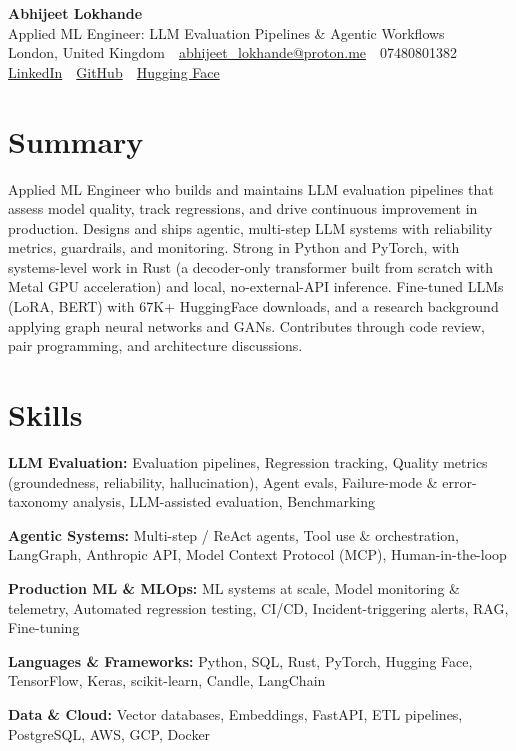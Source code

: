 \documentclass[10pt,a4paper]{article}
\newcommand{\sep}{\,\textcolor{accent!60}{\textbar}\,}
\begin{document}
\begin{center}
  {\fontsize{24}{26}\selectfont\bfseries Abhijeet Lokhande}\\[3pt]
  {\color{accent}\large Applied ML Engineer: LLM Evaluation Pipelines \& Agentic Workflows}\\[5pt]
  {\small
    London, United Kingdom \sep
    \href{mailto:abhijeet_lokhande@proton.me}{abhijeet\_lokhande@proton.me} \sep
    07480801382 \\[2pt]
    \href{https://www.linkedin.com/in/ablds/}{LinkedIn} \sep
    \href{https://github.com/abhijeetscode}{GitHub} \sep
    \href{https://huggingface.co/ab-ai}{Hugging Face}
  }
\end{center}
\vspace{2pt}

\section{Summary}
Applied ML Engineer who builds and maintains LLM evaluation pipelines that assess model quality, track regressions, and drive continuous improvement in production. Designs and ships agentic, multi-step LLM systems with reliability metrics, guardrails, and monitoring. Strong in Python and PyTorch, with systems-level work in Rust (a decoder-only transformer built from scratch with Metal GPU acceleration) and local, no-external-API inference. Fine-tuned LLMs (LoRA, BERT) with 67K+ HuggingFace downloads, and a research background applying graph neural networks and GANs. Contributes through code review, pair programming, and architecture discussions.

\section{Skills}
\begin{tight}
  \item[\textcolor{accent}{\small$\bullet$}] \textbf{LLM Evaluation:} Evaluation pipelines, Regression tracking, Quality metrics (groundedness, reliability, hallucination), Agent evals, Failure-mode \& error-taxonomy analysis, LLM-assisted evaluation, Benchmarking
  \item[\textcolor{accent}{\small$\bullet$}] \textbf{Agentic Systems:} Multi-step / ReAct agents, Tool use \& orchestration, LangGraph, Anthropic API, Model Context Protocol (MCP), Human-in-the-loop
  \item[\textcolor{accent}{\small$\bullet$}] \textbf{Production ML \& MLOps:} ML systems at scale, Model monitoring \& telemetry, Automated regression testing, CI/CD, Incident-triggering alerts, RAG, Fine-tuning
  \item[\textcolor{accent}{\small$\bullet$}] \textbf{Languages \& Frameworks:} Python, SQL, Rust, PyTorch, Hugging Face, TensorFlow, Keras, scikit-learn, Candle, LangChain
  \item[\textcolor{accent}{\small$\bullet$}] \textbf{Data \& Cloud:} Vector databases, Embeddings, FastAPI, ETL pipelines, PostgreSQL, AWS, GCP, Docker
\end{tight}
\end{document}
